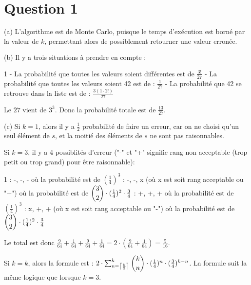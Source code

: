 \documentclass[12pt,letterpaper]{article}
\DeclarePairedDelimiter{\ceil}{\lceil}{\rceil}
\begin{document}
\section*{Question 1}

(a) L'algorithme est de Monte Carlo, puisque le temps d'exécution est borné par la valeur de $k$, permettant alors de possiblement retourner une valeur erronée.\newline

(b) Il y a trois situations à prendre en compte : \newline

1 - La probabilité que toutes les valeurs soient différentes est de $\frac{3!}{27}$ - La probabilité que toutes les valeurs soient 42 est de : $\frac{1}{27}$ - La probabilité que 42 se retrouve dans la liste est de : $\frac{3(1\cdot 2!)}{27}$\newline

Le $27$ vient de $3^3$. Donc la probabilité totale est de $\frac{13}{27}$.\newline

(c) Si $k = 1$, alors il y a $\frac{1}{2}$ probabilité de faire un erreur, car on ne choisi qu'un seul élément de $s$, et la moitié des éléments de $s$ ne sont pas raisonnables.\newline

Si $k = 3$, il y a 4 possiblités d'erreur ("-" et "+" signifie rang non acceptable (trop petit ou trop grand) pour être raisonnable):\newline

1 : -, -, - où la probabilité est de $(\frac{1}{4})^3$ : -, -, x (où x est soit rang acceptable ou "+") où la probabilité est de $\dbinom{3}{2} \cdot (\frac{1}{4})^2 \cdot \frac{3}{4}$ : +, +, + où la probabilité est de $(\frac{1}{4})^3$ : x, +, + (où x est soit rang acceptable ou "-") où la probabilité est de $\dbinom{3}{2} \cdot (\frac{1}{4})^2 \cdot \frac{3}{4}$\newline

Le total est donc $\frac{9}{64} + \frac{1}{64} + \frac{9}{64} + \frac{1}{64} = 2 \cdot (\frac{9}{64} + \frac{1}{64}) = \frac{5}{16}$.\newline

Si $k = k$, alors la formule est : $2 \cdot \sum_{n = \ceil*{\frac{k}{2}}}^{k} \dbinom{k}{n} \cdot (\frac{1}{4})^n \cdot (\frac{3}{4})^{k-n}$. La formule suit la même logique que lorsque $k = 3$.\newline
\end{document}
